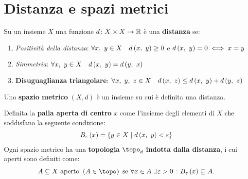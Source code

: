 \section{Distanza e spazi metrici}
\begin{define}
Su un insieme $X$ una funzione $d\colon X\times X\rightarrow \mathbb{R}$ è una \textbf{distanza} se:
\begin{enumerate}
\item \textit{Positività della distanza}: $\forall x,\ y\in X\quad d\left(x,\ y\right)\geq 0$ e $d\left(x,\ y\right)=0\iff x=y$
\item \textit{Simmetria}: $\forall x,\ y\in X\quad d\left(x,\ y\right)=d\left(y,\ x\right)$
\item \textbf{Disuguaglianza triangolare}: $\forall x,\ y,\ z\in X\quad d\left(x,\ z\right)\leq d\left(x,\ y\right)+d\left(y,\ z\right)$
\end{enumerate}
\end{define}
\begin{define}
Uno \textbf{spazio metrico} $\left(X, d\right)$ è un insieme su cui è definita una distanza.
\end{define}
\begin{define}
Definita la \textbf{palla aperta di centro} $x$ come l'insieme degli elementi di $X$ che soddisfano la seguente condizione:
\begin{equation}
B_{\varepsilon}\left(x\right)=\left\{y\in X\mid d\left(x,\ y\right)<\varepsilon\right\}
\end{equation}
Ogni spazio metrico ha una \textbf{topologia} $\topo_d$ \textbf{indotta dalla distanza}, i cui aperti sono definiti come:
\begin{equation*}
A\subseteq X \text{ aperto } \left(A\in\topo\right) \text{ se } \forall x\in A\ \exists \epsilon>0\ \colon B_{\epsilon}\left(x\right)\subseteq A.
\end{equation*}
\end{define}
